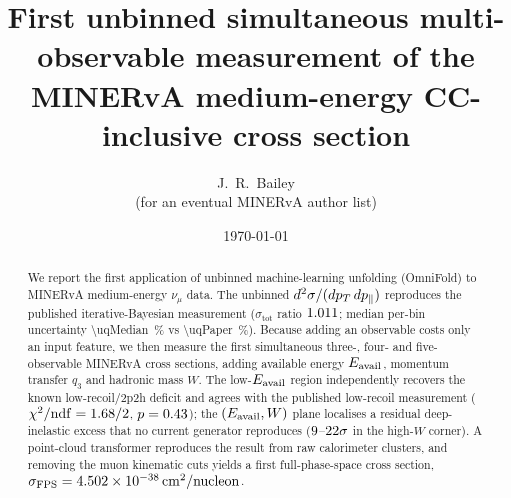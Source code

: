 \documentclass[11pt]{article}
\title{First unbinned simultaneous multi-observable measurement of the
MINERvA medium-energy CC-inclusive cross section}
\author{J.~R.~Bailey \\ \small (for an eventual MINERvA author list)}
\date{\today}
\begin{document}
\maketitle

\begin{abstract}
We report the first application of unbinned machine-learning unfolding
(OmniFold) to MINERvA medium-energy $\nu_\mu$ data. The unbinned
$d^{2}\sigma/(dp_{T}\,dp_{\parallel})$ reproduces the published iterative-Bayesian
measurement ($\sigma_{\mathrm{tot}}$ ratio $1.011$; median per-bin
uncertainty \SI{\uqMedian}{\percent} vs \SI{\uqPaper}{\percent}). Because adding
an observable costs only an input feature, we then measure the first
simultaneous three-, four- and five-observable MINERvA cross sections, adding
available energy $E_{\mathrm{avail}}$, momentum transfer $q_{3}$ and hadronic mass $W$. The
low-$E_{\mathrm{avail}}$ region independently recovers the known low-recoil/2p2h deficit
and agrees with the published low-recoil measurement
($\chi^{2}/\mathrm{ndf}=1.68/2$, $p=0.43$); the $(E_{\mathrm{avail}},W)$ plane
localises a residual deep-inelastic excess that no current generator reproduces
($9$--$22\sigma$ in the high-$W$ corner). A point-cloud
transformer reproduces the result from raw calorimeter clusters, and removing
the muon kinematic cuts yields a first full-phase-space cross section,
$\sigma_{\mathrm{FPS}}=\SI{4.502e-38}{cm^2/nucleon}$.
\end{abstract}



\printbibliography
\end{document}
